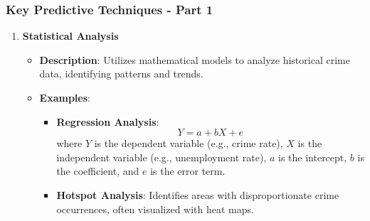 \documentclass[aspectratio=169]{beamer}
\begin{document}
\begin{frame}
    \frametitle{Key Predictive Techniques - Part 1}
    \begin{enumerate}
        \item \textbf{Statistical Analysis}
        \begin{itemize}
            \item \textbf{Description}: Utilizes mathematical models to analyze historical crime data, identifying patterns and trends.
            \item \textbf{Examples}:
            \begin{itemize}
                \item \textbf{Regression Analysis}:
                \begin{equation}
                    Y = a + bX + e 
                \end{equation}
                where \( Y \) is the dependent variable (e.g., crime rate), \( X \) is the independent variable (e.g., unemployment rate), \( a \) is the intercept, \( b \) is the coefficient, and \( e \) is the error term.
                \item \textbf{Hotspot Analysis}: Identifies areas with disproportionate crime occurrences, often visualized with heat maps.
            \end{itemize}
        \end{itemize}
    \end{enumerate}
\end{frame}
\end{document}
